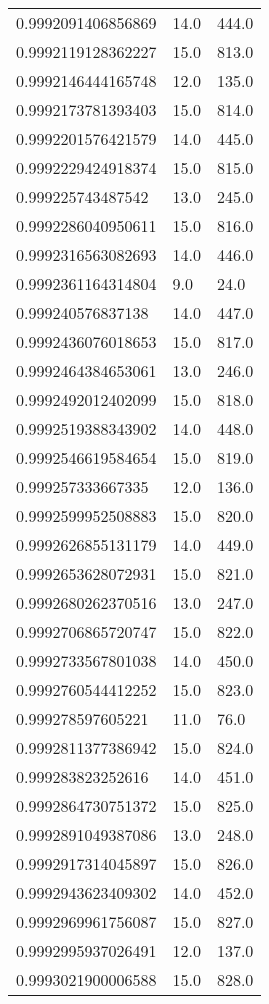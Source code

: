 \begin{center}
\begin{supertabular}[H]{p{0.30\textwidth}p{0.05\textwidth}p{0.05\textwidth}}
0.9992091406856869 & 14.0 & 444.0 \\ 
0.9992119128362227 & 15.0 & 813.0 \\ 
0.9992146444165748 & 12.0 & 135.0 \\ 
0.9992173781393403 & 15.0 & 814.0 \\ 
0.9992201576421579 & 14.0 & 445.0 \\ 
0.9992229424918374 & 15.0 & 815.0 \\ 
0.999225743487542 & 13.0 & 245.0 \\ 
0.9992286040950611 & 15.0 & 816.0 \\ 
0.9992316563082693 & 14.0 & 446.0 \\ 
0.9992361164314804 & 9.0 & 24.0 \\ 
0.999240576837138 & 14.0 & 447.0 \\ 
0.9992436076018653 & 15.0 & 817.0 \\ 
0.9992464384653061 & 13.0 & 246.0 \\ 
0.9992492012402099 & 15.0 & 818.0 \\ 
0.9992519388343902 & 14.0 & 448.0 \\ 
0.9992546619584654 & 15.0 & 819.0 \\ 
0.999257333667335 & 12.0 & 136.0 \\ 
0.9992599952508883 & 15.0 & 820.0 \\ 
0.9992626855131179 & 14.0 & 449.0 \\ 
0.9992653628072931 & 15.0 & 821.0 \\ 
0.9992680262370516 & 13.0 & 247.0 \\ 
0.9992706865720747 & 15.0 & 822.0 \\ 
0.9992733567801038 & 14.0 & 450.0 \\ 
0.9992760544412252 & 15.0 & 823.0 \\ 
0.999278597605221 & 11.0 & 76.0 \\ 
0.9992811377386942 & 15.0 & 824.0 \\ 
0.999283823252616 & 14.0 & 451.0 \\ 
0.9992864730751372 & 15.0 & 825.0 \\ 
0.9992891049387086 & 13.0 & 248.0 \\ 
0.9992917314045897 & 15.0 & 826.0 \\ 
0.9992943623409302 & 14.0 & 452.0 \\ 
0.9992969961756087 & 15.0 & 827.0 \\ 
0.9992995937026491 & 12.0 & 137.0 \\ 
0.9993021900006588 & 15.0 & 828.0 \\ 

\end{supertabular}
\end{center}
